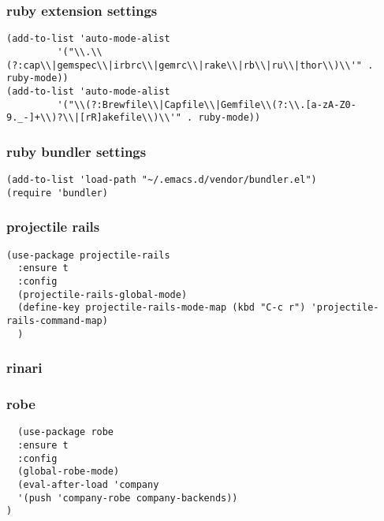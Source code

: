 \documentclass[11pt]{article}
\begin{document}
\subsubsection*{ruby extension settings}
\label{sec:org181159c}
\begin{verbatim}
(add-to-list 'auto-mode-alist
	     '("\\.\\(?:cap\\|gemspec\\|irbrc\\|gemrc\\|rake\\|rb\\|ru\\|thor\\)\\'" . ruby-mode))
(add-to-list 'auto-mode-alist
	     '("\\(?:Brewfile\\|Capfile\\|Gemfile\\(?:\\.[a-zA-Z0-9._-]+\\)?\\|[rR]akefile\\)\\'" . ruby-mode))
\end{verbatim}
\subsubsection*{ruby bundler settings}
\label{sec:org06f2ccb}
\begin{verbatim}
(add-to-list 'load-path "~/.emacs.d/vendor/bundler.el")
(require 'bundler)
\end{verbatim}
\subsubsection*{projectile rails}
\label{sec:org6a04525}
\begin{verbatim}
(use-package projectile-rails
  :ensure t
  :config
  (projectile-rails-global-mode)
  (define-key projectile-rails-mode-map (kbd "C-c r") 'projectile-rails-command-map)
  )
\end{verbatim}
\subsubsection*{rinari}
\label{sec:org608b5c4}
\subsubsection*{robe}
\label{sec:org1bc501c}
\begin{verbatim}
  (use-package robe
  :ensure t
  :config
  (global-robe-mode)
  (eval-after-load 'company
  '(push 'company-robe company-backends))
)
\end{verbatim}
\end{document}
